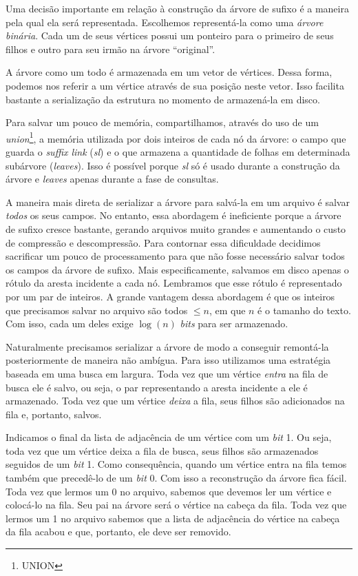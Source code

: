 \documentclass[]{article}
\begin{document}
Uma decisão importante em relação à construção da árvore de sufixo é a maneira pela qual ela será representada. Escolhemos representá-la como uma \textit{árvore binária}. Cada um de seus vértices possui um ponteiro para o primeiro de seus filhos e outro para seu irmão na árvore ``original''. 

A árvore como um todo é armazenada em um vetor de vértices. Dessa forma, podemos nos referir a um vértice através de sua posição neste vetor. Isso facilita bastante a serialização da estrutura no momento de armazená-la em disco. 

Para salvar um pouco de memória, compartilhamos, através do uso de um \textit{union}\footnote{UNION}, a memória utilizada por dois inteiros de cada nó da árvore: o campo que guarda o \textit{suffix link} (\textit{sl}) e o que armazena a quantidade de folhas em determinada subárvore (\textit{leaves}). Isso é possível porque \textit{sl} só é usado durante a construção da árvore e \textit{leaves} apenas durante a fase de consultas.

A maneira mais direta de serializar a árvore para salvá-la em um arquivo é salvar \textit{todos} os seus campos. No entanto, essa abordagem é ineficiente porque a árvore de sufixo cresce bastante, gerando arquivos muito grandes e aumentando o custo de compressão e descompressão. Para contornar essa dificuldade decidimos sacrificar um pouco de processamento para que não fosse necessário salvar todos os campos da árvore de sufixo. Mais especificamente, salvamos em disco apenas o rótulo da aresta incidente a cada nó. Lembramos que esse rótulo é representado por um par de inteiros. A grande vantagem dessa abordagem é que os inteiros que precisamos salvar no arquivo são todos $\leq n$, em que $n$ é o tamanho do texto. Com isso, cada um deles exige $\log(n)$ \textit{bits} para ser armazenado.

Naturalmente precisamos serializar a árvore de modo a conseguir remontá-la posteriormente de maneira não ambígua. Para isso utilizamos uma estratégia baseada em uma busca em largura. Toda vez que um vértice \textit{entra} na fila de busca ele é salvo, ou seja, o par representando a aresta incidente a ele é armazenado. Toda vez que um vértice \textit{deixa} a fila, seus filhos são adicionados na fila e, portanto, salvos. 

Indicamos o final da lista de adjacência de um vértice com um \textit{bit} 1. Ou seja, toda vez que um vértice deixa a fila de busca, seus filhos são armazenados seguidos de um \textit{bit} 1. Como consequência, quando um vértice entra na fila temos também que precedê-lo de um \textit{bit} 0. Com isso a reconstrução da árvore fica fácil. Toda vez que lermos um 0 no arquivo, sabemos que devemos ler um vértice e colocá-lo na fila. Seu pai na árvore será o vértice na cabeça da fila. Toda vez que lermos um 1 no arquivo sabemos que a lista de adjacência do vértice na cabeça da fila acabou e que, portanto, ele deve ser removido. 
\end{document}
